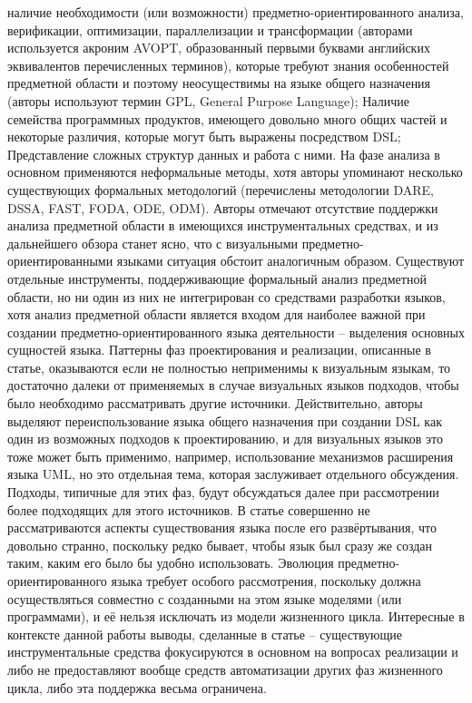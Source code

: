 наличие необходимости (или возможности) предметно-ориентированного анализа, верификации, оптимизации, параллелизации и трансформации (авторами используется акроним AVOPT, образованный первыми буквами английских эквивалентов перечисленных терминов), которые требуют знания особенностей предметной области и поэтому неосуществимы на языке общего назначения (авторы используют термин GPL, General Purpose Language);
Наличие семейства программных продуктов, имеющего довольно много общих частей и некоторые различия, которые могут быть выражены посредством DSL;
Представление сложных структур данных и работа с ними.
	На фазе анализа в основном применяются неформальные методы, хотя авторы упоминают несколько существующих формальных методологий (перечислены методологии DARE, DSSA, FAST, FODA, ODE, ODM). Авторы отмечают отсутствие поддержки анализа предметной области в имеющихся инструментальных средствах, и из дальнейшего обзора станет ясно, что с визуальными предметно-ориентированными языками ситуация обстоит аналогичным образом. Существуют отдельные инструменты, поддерживающие формальный анализ предметной области, но ни один из них не интегрирован со средствами разработки языков, хотя анализ предметной области является входом для наиболее важной при создании предметно-ориентированного языка деятельности – выделения основных сущностей языка.
	Паттерны фаз проектирования и реализации, описанные в статье, оказываются если не полностью неприменимы к визуальным языкам, то достаточно далеки от применяемых в случае визуальных языков подходов, чтобы было необходимо рассматривать другие источники. Действительно, авторы выделяют переиспользование языка общего назначения при создании DSL как один из возможных подходов к проектированию, и для визуальных языков это тоже может быть применимо, например, использование механизмов расширения языка UML, но это отдельная тема, которая заслуживает отдельного обсуждения. Подходы, типичные для этих фаз, будут обсуждаться далее при рассмотрении более подходящих для этого источников.
	В статье совершенно не рассматриваются аспекты существования языка после его развёртывания, что довольно странно, поскольку редко бывает, чтобы язык был сразу же создан таким, каким его было бы удобно использовать. Эволюция предметно-ориентированного языка требует особого рассмотрения, поскольку должна осуществляться совместно с созданными на этом языке моделями (или программами), и её нельзя исключать из модели жизненного цикла. Интересные в контексте данной работы выводы, сделанные в статье – существующие инструментальные средства фокусируются в основном на вопросах реализации и либо не предоставляют вообще средств автоматизации других фаз жизненного цикла, либо эта поддержка весьма ограничена. 
